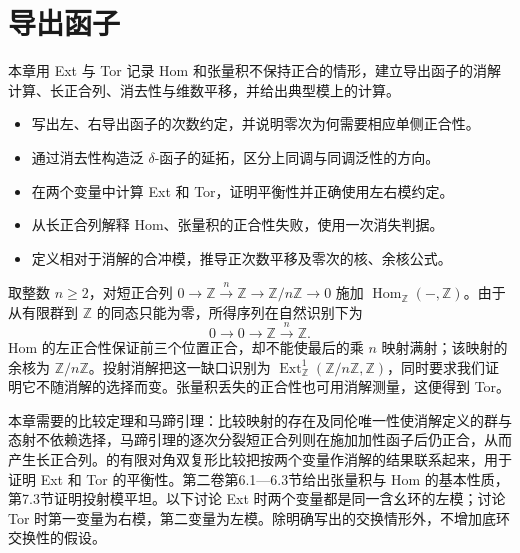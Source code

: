 
\chapter{导出函子}
\label{b4:ch:08}

\begin{chapterabstract}
	本章用 Ext 与 Tor 记录 Hom 和张量积不保持正合的情形，建立导出函子的消解计算、长正合列、消去性与维数平移，并给出典型模上的计算。
\end{chapterabstract}

\begin{learninggoals}
	\begin{itemize}
		\item 写出左、右导出函子的次数约定，并说明零次为何需要相应单侧正合性。
		\item 通过消去性构造泛 \(\delta\)-函子的延拓，区分上同调与同调泛性的方向。
		\item 在两个变量中计算 Ext 和 Tor，证明平衡性并正确使用左右模约定。
		\item 从长正合列解释 Hom、张量积的正合性失败，使用一次消失判据。
		\item 定义相对于消解的合冲模，推导正次数平移及零次的核、余核公式。
	\end{itemize}
\end{learninggoals}

取整数 \(n\ge2\)，对短正合列 \(0\rightarrow\mathbb Z\xrightarrow{n}\mathbb Z\rightarrow\mathbb Z/n\mathbb Z\rightarrow0\) 施加 \(\operatorname{Hom}_{\mathbb Z}(-,\mathbb Z)\)。由于从有限群到 \(\mathbb Z\) 的同态只能为零，所得序列在自然识别下为
\[
	0\longrightarrow0\longrightarrow\mathbb Z \xrightarrow{n}\mathbb Z.
\]
Hom 的左正合性保证前三个位置正合，却不能使最后的乘 \(n\) 映射满射；该映射的余核为 \(\mathbb Z/n\mathbb Z\)。投射消解把这一缺口识别为 \(\operatorname{Ext}_{\mathbb Z}^1(\mathbb Z/n\mathbb Z,\mathbb Z)\)，同时要求我们证明它不随消解的选择而变。张量积丢失的正合性也可用消解测量，这便得到 Tor。

\ProseParagraphBreak
本章需要的比较定理和马蹄引理：比较映射的存在及同伦唯一性使消解定义的群与态射不依赖选择，马蹄引理的逐次分裂短正合列则在施加加性函子后仍正合，从而产生长正合列。的有限对角双复形比较把按两个变量作消解的结果联系起来，用于证明 Ext 和 Tor 的平衡性。第二卷第6.1—6.3节给出张量积与 Hom 的基本性质，第7.3节证明投射模平坦。以下讨论 Ext 时两个变量都是同一含幺环的左模；讨论 Tor 时第一变量为右模，第二变量为左模。除明确写出的交换情形外，不增加底环交换性的假设。

